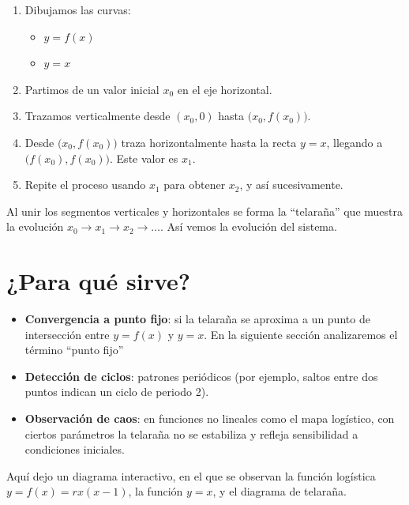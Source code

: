 \documentclass[
  10pt,
  a4paper,
  DIV=11,
  numbers=noendperiod,
  open=any]{scrreprt}
\providecommand{\tightlist}{%
  \setlength{\itemsep}{0pt}\setlength{\parskip}{0pt}}
\numberwithin{equation}{chapter}
\numberwithin{equation}{chapter}
\renewcommand{\[}{\begin{equation}}
\renewcommand{\]}{\end{equation}}
\begin{document}
\begin{enumerate}
\def\labelenumi{\arabic{enumi}.}
\tightlist
\item
  Dibujamos las curvas:

  \begin{itemize}
  \tightlist
  \item
    \(y = f(x)\)
  \item
    \(y = x\)\\
  \end{itemize}
\item
  Partimos de un valor inicial \(x_0\) en el eje horizontal.\\
\item
  Trazamos verticalmente desde \((x_0,0)\) hasta
  \(\bigl(x_0, f(x_0)\bigr)\).\\
\item
  Desde \(\bigl(x_0, f(x_0)\bigr)\) traza horizontalmente hasta la recta
  \(y=x\), llegando a \(\bigl(f(x_0), f(x_0)\bigr)\). Este valor es
  \(x_1\).\\
\item
  Repite el proceso usando \(x_1\) para obtener \(x_2\), y así
  sucesivamente.
\end{enumerate}

Al unir los segmentos verticales y horizontales se forma la ``telaraña''
que muestra la evolución \(x_0 \to x_1 \to x_2 \to \dots\). Así vemos la
evolución del sistema.

\section{¿Para qué sirve?}\label{para-quuxe9-sirve}

\begin{itemize}
\tightlist
\item
  \textbf{Convergencia a punto fijo}: si la telaraña se aproxima a un
  punto de intersección entre \(y=f(x)\) y \(y=x\). En la siguiente
  sección analizaremos el término ``punto fijo''
\item
  \textbf{Detección de ciclos}: patrones periódicos (por ejemplo, saltos
  entre dos puntos indican un ciclo de periodo 2).\\
\item
  \textbf{Observación de caos}: en funciones no lineales como el mapa
  logístico, con ciertos parámetros la telaraña no se estabiliza y
  refleja sensibilidad a condiciones iniciales.
\end{itemize}

Aquí dejo un diagrama interactivo, en el que se observan la función
logística \(y=f(x)=rx(x-1)\), la función \(y = x\), y el diagrama de
telaraña.
\end{document}
